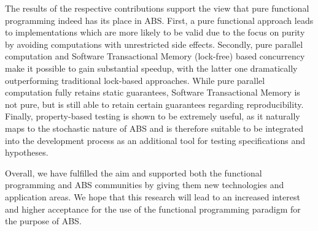 The results of the respective contributions support the view that pure functional programming indeed has its place in ABS. First, a pure functional approach leads to implementations which are more likely to be valid due to the focus on purity by avoiding computations with unrestricted side effects. Secondly, pure parallel computation and Software Transactional Memory (lock-free) based concurrency make it possible to gain substantial speedup, with the latter one dramatically outperforming traditional lock-based approaches. While pure parallel computation fully retains static guarantees, Software Transactional Memory is not pure, but is still able to retain certain guarantees regarding reproducibility. Finally, property-based testing is shown to be extremely useful, as it naturally maps to the stochastic nature of ABS and is therefore suitable to be integrated into the development process as an additional tool for testing specifications and hypotheses.

Overall, we have fulfilled the aim and supported both the functional programming and ABS communities by giving them new technologies and application areas. We hope that this research will lead to an increased interest and higher acceptance for the use of the functional programming paradigm for the purpose of ABS.
